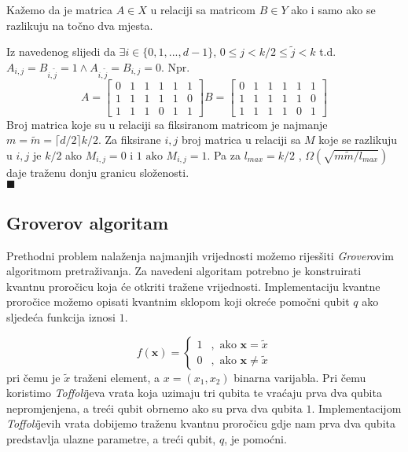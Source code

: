 \documentclass[a4paper,12pt]{article}
\newcommand\ceil[1]{\lceil#1\rceil}
\begin{document}
Ka\v{z}emo da je matrica $A \in X$ u relaciji sa matricom $B \in Y$ ako i samo ako se razlikuju na to\v{c}no dva mjesta.

Iz navedenog slijedi da $ \exists i \in \{0, 1, ..., d-1 \}$, $0 \leq j < k/2 \leq \tilde{j} <k $ t.d. $A_{i,j}=B_{i, \tilde{j}} = 1 \land A_{i, \tilde{j} }=B_{i,j}=0$. Npr.
\begin{equation*}
	A=	\left[
		\begin{matrix}
			0 & 1 & 1 & 1 & 1 & 1\\
			1 & 1 & 1 & 1 & 1 & 0\\
			1 & 1 & 1 & 0 & 1 & 1
		\end{matrix}
		\right]
	 B=	\left[
		\begin{matrix}
			0 & 1 & 1 & 1 & 1 & 1\\
			1 & 1 & 1 & 1 & 1 & 0\\
			1 & 1 & 1 & 1 & 0 & 1
		\end{matrix}
		\right]
\end{equation*}
Broj matrica koje su u relaciji sa fiksiranom matricom je najmanje $m= \tilde{m} = \ceil{d/2} k/2$. Za fiksirane $i,j$ broj matrica u relaciji sa $M$ koje se razlikuju u $i,j$ je $k/2$ ako $M_{i,j}=0 \text{ i } 1 \text{ ako } M_{i,j}=1$. Pa za $l_{max}=k/2$ , $\Omega( \sqrt{m \tilde{m} /l_{max}})$ daje tra\v{z}enu donju granicu slo\v{z}enosti.\\
$\blacksquare$

\subsection{Groverov algoritam}
Prethodni problem nala\v{z}enja najmanjih vrijednosti mo\v{z}emo rijes\v{s}iti \emph{Grover}ovim algoritmom pretra\v{z}ivanja. Za navedeni algoritam potrebno je konstruirati kvantnu proro\v{c}icu koja \'ce otkriti tra\v{z}ene vrijednosti. Implementaciju kvantne proro\v{c}ice mo\v{z}emo opisati kvantnim sklopom koji okre\'ce pomo\v{c}ni qubit $q$ ako sljede\'ca funkcija iznosi $1$.

\begin{equation*}
f(\boldsymbol{x}) = \begin{cases}
1              &, \text{  ako     } \boldsymbol{x}=\tilde{x}\\
0			  &, \text{  ako  } \boldsymbol{x} \ne \tilde{x}
\end{cases}
\end{equation*}
pri \v{c}emu je $\tilde{x}$ tra\v{z}eni element, a $ x=(x_1,x_2)$ binarna varijabla. Pri \v{c}emu koristimo \emph{Toffoli}jeva vrata koja uzimaju tri qubita te vra\'caju prva dva qubita nepromjenjena, a tre\'ci qubit obrnemo ako su prva dva qubita $1$. Implementacijom \emph{Toffoli}jevih vrata dobijemo tra\v{z}enu kvantnu proro\v{c}icu gdje nam prva dva qubita predstavlja ulazne parametre,  a tre\'ci qubit, $q$,  je pomo\'cni.
\end{document}
